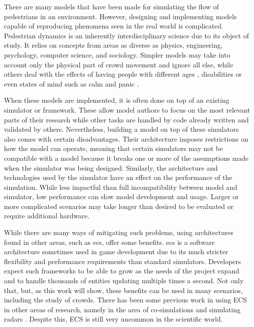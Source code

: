 \documentclass[twoside, 11pt]{article}
\begin{document}
There are many  models that have been made for simulating the flow of pedestrians in an environment. However, designing and implementing models capable of reproducing phenomena seen in the real world is complicated. Pedestrian dynamics is an inherently interdisciplinary science \cite{kleinmeierVadereOpenSourceSimulation2019} due to its object of study. It relies on concepts from areas as diverse as physics, engineering, psychology, computer science, and sociology. Simpler models may take into account only the physical part of crowd movement and ignore all else, while others deal with the effects of having people with different ages \cite{gorriniAgeGroupdrivenPedestrian2016}, disabilities \cite{fuExperimentalStudyBidirectional2022} or even states of mind such as calm and panic \cite{Alrashed_Shamma_2020}.

When these models are implemented, it is often done on top of an existing simulator or framework. These allow model authors to focus on the most relevant parts of their research while other tasks are handled by code already written and validated by others. Nevertheless, building a model on top of these simulators also comes with certain disadvantages. Their architecture imposes restrictions on how the model can operate, meaning that certain simulators may not be compatible with a model because it breaks one or more of the assumptions made when the simulator was being designed. Similarly, the architecture and technologies used by the simulator have an effect on the performance of the simulation. While less impactful than full incompatibility between model and simulator, low performance can slow model development and usage. Larger or more complicated scenarios may take longer than desired to be evaluated or require additional hardware.

While there are many ways of mitigating such problems, using architectures found in other areas, such as \gls{ecs}, offer some benefits. \gls{ecs} is a software architecture sometimes used in game development due to its much stricter flexibility and performance requirements than standard simulators. Developers expect such frameworks to be able to grow as the needs of the project expand and to handle thousands of entities updating multiple times a second. Not only that, but, as this work will show, these benefits can be used in many scenarios, including the study of crowds.  There has been some previous work in using ECS in other areas of research, namely in the area of co-simulations \cite{HATLEDAL2021102243} and simulating radars \cite{satelite}. Despite this, ECS is still very uncommon in the scientific world.
\end{document}
